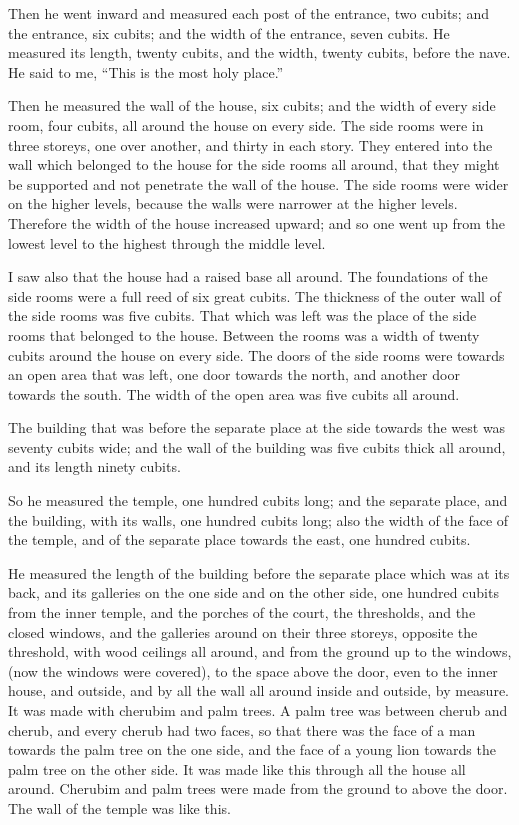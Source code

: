  Then he went inward and measured each post of the entrance,
two cubits; and the entrance, six cubits; and the width of the entrance,
seven cubits.  He measured its length, twenty cubits, and
the width, twenty cubits, before the nave. He said to me, ``This is the
most holy place.''

 Then he measured the wall of the house, six cubits; and the
width of every side room, four cubits, all around the house on every
side.  The side rooms were in three storeys, one over
another, and thirty in each story. They entered into the wall which
belonged to the house for the side rooms all around, that they might be
supported and not penetrate the wall of the house.  The side
rooms were wider on the higher levels, because the walls were narrower
at the higher levels. Therefore the width of the house increased upward;
and so one went up from the lowest level to the highest through the
middle level.

 I saw also that the house had a raised base all around. The
foundations of the side rooms were a full reed of six great cubits.
 The thickness of the outer wall of the side rooms was five
cubits. That which was left was the place of the side rooms that
belonged to the house.  Between the rooms was a width of
twenty cubits around the house on every side.  The doors of
the side rooms were towards an open area that was left, one door towards
the north, and another door towards the south. The width of the open
area was five cubits all around.

 The building that was before the separate place at the
side towards the west was seventy cubits wide; and the wall of the
building was five cubits thick all around, and its length ninety cubits.

 So he measured the temple, one hundred cubits long; and
the separate place, and the building, with its walls, one hundred cubits
long;  also the width of the face of the temple, and of the
separate place towards the east, one hundred cubits.

 He measured the length of the building before the separate
place which was at its back, and its galleries on the one side and on
the other side, one hundred cubits from the inner temple, and the
porches of the court,  the thresholds, and the closed
windows, and the galleries around on their three storeys, opposite the
threshold, with wood ceilings all around, and from the ground up to the
windows, (now the windows were covered),  to the space
above the door, even to the inner house, and outside, and by all the
wall all around inside and outside, by measure.  It was
made with cherubim and palm trees. A palm tree was between cherub and
cherub, and every cherub had two faces,  so that there was
the face of a man towards the palm tree on the one side, and the face of
a young lion towards the palm tree on the other side. It was made like
this through all the house all around.  Cherubim and palm
trees were made from the ground to above the door. The wall of the
temple was like this.

